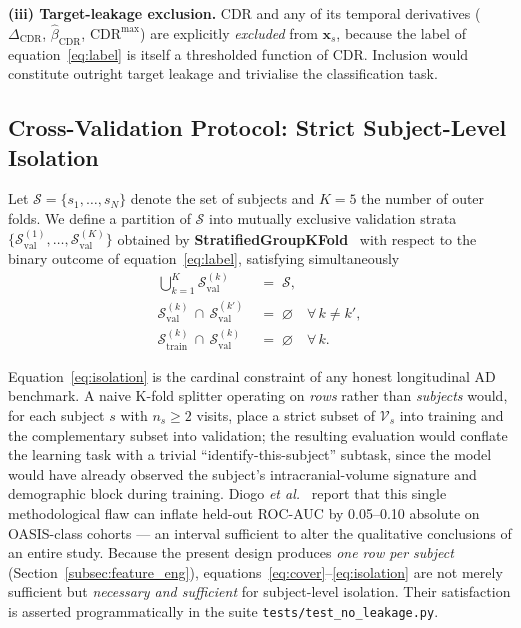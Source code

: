 \textbf{(iii) Target-leakage exclusion.} CDR and any of its temporal derivatives ($\Delta_{\mathrm{CDR}}$, $\hat{\beta}_{\mathrm{CDR}}$, $\mathrm{CDR}^{\max}$) are explicitly \emph{excluded} from $\mathbf{x}_s$, because the label of equation~\eqref{eq:label} is itself a thresholded function of CDR. Inclusion would constitute outright target leakage and trivialise the classification task.

\subsection{Cross-Validation Protocol: Strict Subject-Level Isolation}
\label{subsec:cv}

Let $\mathcal{S} = \{s_1, \ldots, s_N\}$ denote the set of subjects and $K = 5$ the number of outer folds. We define a partition of $\mathcal{S}$ into mutually exclusive validation strata $\bigl\{\mathcal{S}_\mathrm{val}^{(1)}, \ldots, \mathcal{S}_\mathrm{val}^{(K)}\bigr\}$ obtained by \textbf{StratifiedGroupKFold}~\cite{scikitlearn} with respect to the binary outcome of equation~\eqref{eq:label}, satisfying simultaneously
\begin{align}
\bigcup_{k=1}^{K} \mathcal{S}_\mathrm{val}^{(k)} \;&=\; \mathcal{S}, \label{eq:cover}\\
\mathcal{S}_\mathrm{val}^{(k)} \,\cap\, \mathcal{S}_\mathrm{val}^{(k')} \;&=\; \varnothing \quad \forall\, k \ne k', \label{eq:disjoint}\\
\mathcal{S}_\mathrm{train}^{(k)} \,\cap\, \mathcal{S}_\mathrm{val}^{(k)} \;&=\; \varnothing \quad \forall\, k. \label{eq:isolation}
\end{align}

Equation~\eqref{eq:isolation} is the cardinal constraint of any honest longitudinal AD benchmark. A naive K-fold splitter operating on \emph{rows} rather than \emph{subjects} would, for each subject $s$ with $n_s \ge 2$ visits, place a strict subset of $\mathcal{V}_s$ into training and the complementary subset into validation; the resulting evaluation would conflate the learning task with a trivial ``identify-this-subject'' subtask, since the model would have already observed the subject's intracranial-volume signature and demographic block during training. Diogo \emph{et al.}~\cite{diogo2022} report that this single methodological flaw can inflate held-out ROC-AUC by 0.05--0.10 absolute on OASIS-class cohorts --- an interval sufficient to alter the qualitative conclusions of an entire study. Because the present design produces \emph{one row per subject} (Section~\ref{subsec:feature_eng}), equations~\eqref{eq:cover}--\eqref{eq:isolation} are not merely sufficient but \emph{necessary and sufficient} for subject-level isolation. Their satisfaction is asserted programmatically in the suite \texttt{tests/test\_no\_leakage.py}.

